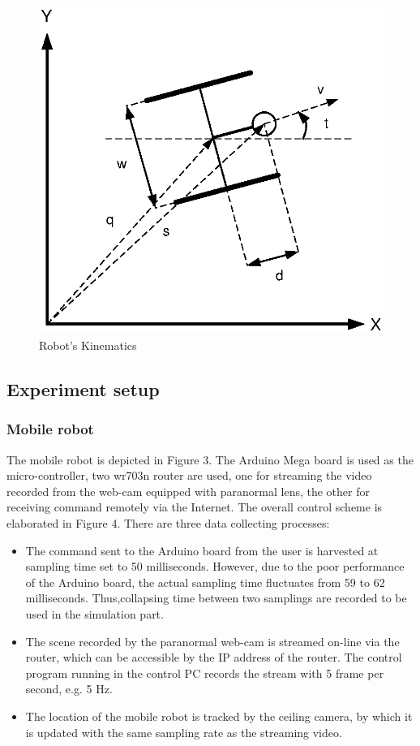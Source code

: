 \documentclass[letterpaper, 10 pt, conference]{ieeeconf}
\begin{document}
\begin{figure}
\centering
\includegraphics[width=.7\columnwidth]{Robot_kinematics.eps}
\caption{Robot's Kinematics}
\end{figure}

\subsection{Experiment setup}
\subsubsection{Mobile robot}

The mobile robot is depicted in Figure 3. The Arduino Mega board is used as the micro-controller, two wr703n router are used, one for streaming the video recorded from the web-cam equipped with paranormal lens, the other for receiving command remotely via the Internet. The overall control scheme is elaborated in Figure 4. There are three data collecting processes:
\begin{itemize}
\item The command sent to the Arduino board from the user is harvested at sampling time set to 50 milliseconds. However, due to the poor performance of the Arduino board, the actual sampling time fluctuates from 59 to 62 milliseconds. Thus,collapsing time between two samplings are recorded to be used in the simulation part.
\item The scene recorded by the paranormal web-cam is streamed on-line via the router, which can be accessible by the IP address of the router. The control program running in the control PC records the stream with 5 frame per second, e.g. 5 Hz.
\item The location of the mobile robot is tracked by the ceiling camera, by which it is updated with the same sampling rate as the streaming video.   
\end{itemize}
\end{document}
